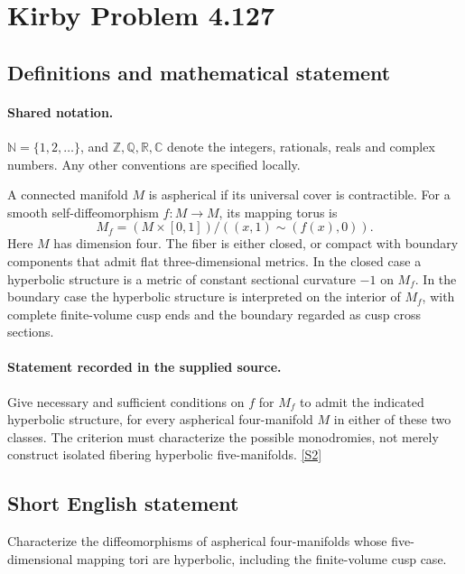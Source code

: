 \documentclass[11pt]{article}
\newcommand{\sref}[2]{\hyperlink{source:#1:#2}{[S#2]}}
\begin{document}
\section{Kirby Problem 4.127}\label{statement}

\subsection{Definitions and mathematical statement}

\paragraph{Shared notation.}$\mathbb N=\{1,2,\ldots\}$, and $\mathbb Z,\mathbb Q,\mathbb R,\mathbb C$ denote the integers, rationals, reals and complex numbers. Any other conventions are specified locally.


A connected manifold $M$ is aspherical if its universal cover is contractible. For a smooth self-diffeomorphism $f:M\to M$, its mapping torus is
\[
 M_f=(M\times[0,1])/((x,1)\sim(f(x),0)).
\]
Here $M$ has dimension four. The fiber is either closed, or compact with boundary components that admit flat three-dimensional metrics. In the closed case a hyperbolic structure is a metric of constant sectional curvature $-1$ on $M_f$. In the boundary case the hyperbolic structure is interpreted on the interior of $M_f$, with complete finite-volume cusp ends and the boundary regarded as cusp cross sections.
\paragraph{Statement recorded in the supplied source.}
Give necessary and sufficient conditions on $f$ for $M_f$ to admit the indicated hyperbolic structure, for every aspherical four-manifold $M$ in either of these two classes. The criterion must characterize the possible monodromies, not merely construct isolated fibering hyperbolic five-manifolds. \sref{statement}{2}
\subsection{Short English statement}
Characterize the diffeomorphisms of aspherical four-manifolds whose five-dimensional mapping tori are hyperbolic, including the finite-volume cusp case.
\end{document}
